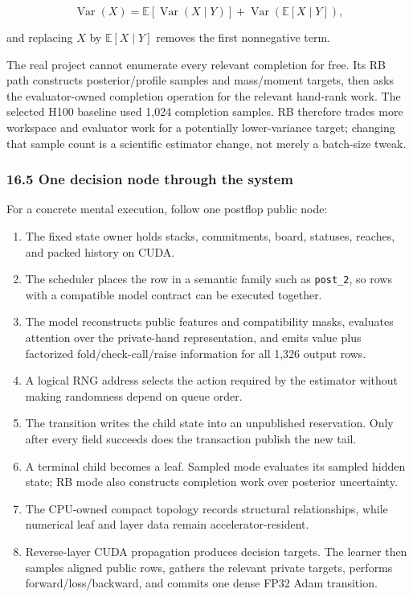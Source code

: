 \documentclass[
  10pt,
  letterpaper,
]{article}
\providecommand{\tightlist}{%
  \setlength{\itemsep}{0pt}\setlength{\parskip}{0pt}}
\begin{document}
\[
\operatorname{Var}(X)
=\mathbb{E}[\operatorname{Var}(X\mid Y)]
+\operatorname{Var}(\mathbb{E}[X\mid Y]),
\]

and replacing \(X\) by \(\mathbb{E}[X\mid Y]\) removes the first
nonnegative term.

The real project cannot enumerate every relevant completion for free.
Its RB path constructs posterior/profile samples and mass/moment
targets, then asks the evaluator-owned completion operation for the
relevant hand-rank work. The selected H100 baseline used 1,024
completion samples. RB therefore trades more workspace and evaluator
work for a potentially lower-variance target; changing that sample count
is a scientific estimator change, not merely a batch-size tweak.

\subsubsection{16.5 One decision node through the
system}\label{165-one-decision-node-through-the-system}

For a concrete mental execution, follow one postflop public node:

\begin{enumerate}
\def\labelenumi{\arabic{enumi}.}
\tightlist
\item
  The fixed state owner holds stacks, commitments, board, statuses,
  reaches, and packed history on CUDA.
\item
  The scheduler places the row in a semantic family such as
  \texttt{post\_2}, so rows with a compatible model contract can be
  executed together.
\item
  The model reconstructs public features and compatibility masks,
  evaluates attention over the private-hand representation, and emits
  value plus factorized fold/check-call/raise information for all 1,326
  output rows.
\item
  A logical RNG address selects the action required by the estimator
  without making randomness depend on queue order.
\item
  The transition writes the child state into an unpublished reservation.
  Only after every field succeeds does the transaction publish the new
  tail.
\item
  A terminal child becomes a leaf. Sampled mode evaluates its sampled
  hidden state; RB mode also constructs completion work over posterior
  uncertainty.
\item
  The CPU-owned compact topology records structural relationships, while
  numerical leaf and layer data remain accelerator-resident.
\item
  Reverse-layer CUDA propagation produces decision targets. The learner
  then samples aligned public rows, gathers the relevant private
  targets, performs forward/loss/backward, and commits one dense FP32
  Adam transition.
\end{enumerate}
\end{document}

